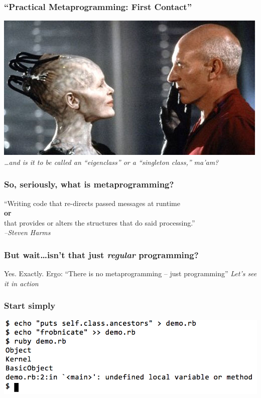 \documentclass[slidestop,compress,mathserif]{beamer}
\begin{document}
\begin{frame}
	\frametitle{``Practical Metaprogramming:  First Contact''}
	\includegraphics[scale=0.55]{img/first_contact.jpg} \\
	\emph{\ldots and is it to be called an ``eigenclass'' or a ``singleton class,'' ma'am?}
\end{frame}
\note{
	\begin{itemize}
		\item 
	\end{itemize}
}

\begin{frame}
	\frametitle{So, seriously, what \textbf{is} metaprogramming?}
	\begin{center}
		\pause
		``Writing code that re-directs passed messages at runtime \\ \textbf{or} \\
that provides or alters the structures that do said processing.''
		\pause
		\emph{\\ --Steven Harms}
	\end{center}
\end{frame}
\note{}

\begin{frame}
	\frametitle{But wait{\ldots}isn't that just \emph{regular} programming?}
	\begin{center}
		Yes.  Exactly.  Ergo:  ``There is no metaprogramming -- just programming''
		\pause
		\vskip 0.25cm
		\emph{Let's see it in action}
	\end{center}
\end{frame}

\begin{frame}
	\frametitle{Start simply}
		\begin{center}
			\includegraphics[scale=0.35]{img/undefined_method_chain.png}
		\end{center}
\end{frame}
\end{document}
